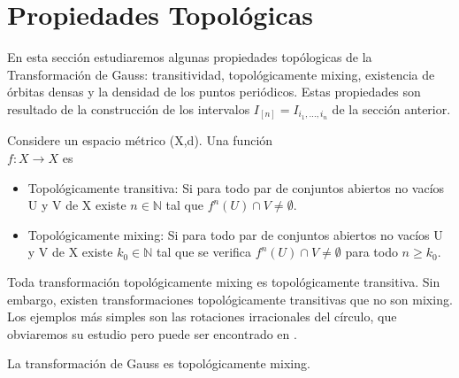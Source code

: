 \section{Propiedades Topológicas}
En esta sección estudiaremos algunas propiedades topólogicas de la Transformación de Gauss: transitividad, topológicamente mixing, existencia de órbitas densas y la densidad de los puntos periódicos. Estas propiedades son resultado de la construcción de los intervalos $I_{[n]}=I_{i_{1},\ldots,i_{n}}$ de la sección anterior.

\begin{defi}
Considere un espacio métrico (X,d). Una función \\$f: X\rightarrow X$ es
\begin{itemize}
    \item Topológicamente transitiva: Si para todo par de conjuntos abiertos no vacíos U y V de X existe $n \in \mathbb{N}$ tal que $f^{n}(U)\cap V\neq\emptyset$.
    \item Topológicamente mixing: Si para todo par de conjuntos abiertos no vacíos U y V de X existe $k_{0}\in \mathbb{N}$ tal que se verifica $f^{n}(U)\cap V\neq\emptyset$ para todo $n\geq k_{0}$.
\end{itemize}

\end{defi}

\begin{obs}
Toda transformación topológicamente mixing es topológicamente transitiva. Sin embargo, existen transformaciones topológicamente transitivas que no son mixing. Los ejemplos más simples son las rotaciones irracionales del círculo, que obviaremos su estudio pero puede ser encontrado en \cite{Portugues}.
\end{obs}



\begin{prop}
La transformación de Gauss es topológicamente mixing.
\end{prop}

